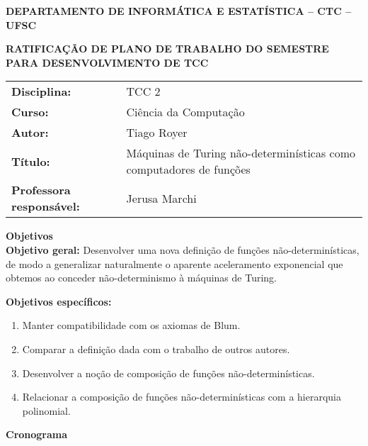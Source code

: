\documentclass[12pt]{letter}
\begin{document}
\pagestyle{empty}

\begin{centering}

    \textbf{DEPARTAMENTO DE INFORMÁTICA E ESTATÍSTICA -- CTC -- UFSC}

    \textbf{RATIFICAÇÃO DE PLANO DE TRABALHO DO SEMESTRE \\ PARA DESENVOLVIMENTO DE TCC}

\end{centering}


\vspace{1em}
\setlength\extrarowheight{5pt}
\begin{tabular}{l l}
    \textbf{Disciplina:} & TCC 2 \\
    \textbf{Curso:}      & Ciência da Computação \\
    \textbf{Autor:}      & Tiago Royer \\
    \textbf{Título:}     & Máquinas de Turing não-determinísticas
                           como computadores de funções \\
    \textbf{Professora responsável:} & Jerusa Marchi \\
\end{tabular}


\vspace{1em}
{\large \textbf{Objetivos}}
\\

\textbf{Objetivo geral:}
Desenvolver uma nova definição de funções não-determinísticas,
de modo a ge\-ne\-ra\-li\-zar naturalmente o aparente aceleramento exponencial
que obtemos ao conceder não-determinismo à máquinas de Turing.

\textbf{Objetivos específicos:}
\begin{enumerate}
    \item Manter compatibilidade com os axiomas de Blum.
    \item Comparar a definição dada com o trabalho de outros autores.
    \item Desenvolver a noção de composição de funções não-determinísticas.
    \item Relacionar a composição de funções não-determinísticas
        com a hierarquia polinomial.
\end{enumerate}


\vspace{1em}
{\large \textbf{Cronograma}}
\end{document}
